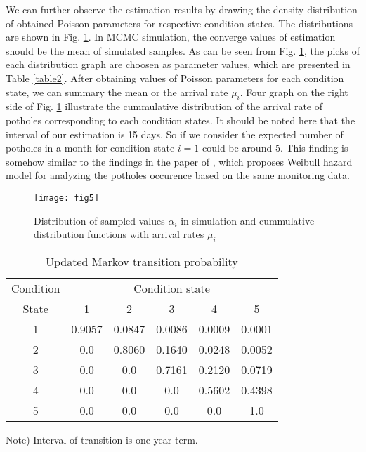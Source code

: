 \documentclass[a4paper,oneside,onecolumn,preprint,10pt,authoryear]{elsarticle}
\begin{document}
We can further observe the estimation results by drawing the density distribution of obtained Poisson parameters for respective condition states. The distributions are shown in Fig. \ref{fig5}. In MCMC simulation, the converge values of estimation should be the mean of simulated samples. As can be seen from Fig. \ref{fig5}, the picks of each distribution graph are choosen as parameter values, which are presented in Table \ref{table2}. After obtaining values of Poisson parameters for each condition state, we can summary the mean or the arrival rate $\mu_i$. Four graph on the right side of Fig. \ref{fig5} illustrate the cummulative distribution of the arrival rate of potholes corresponding to each condition states. It should be noted here that the interval of our estimation is 15 days. So if we consider the expected number of potholes in a month for condition state $i=1$ could be around 5. This finding is somehow similar to the findings in the paper of \citet{kaitokuchi09}, which proposes Weibull hazard model for analyzing the potholes occurence based on the same monitoring data. 

\begin{figure}%
\begin{center}
\begin{footnotesize}
\texttt{[image: fig5]}\\
\end{footnotesize}
\end{center}
\caption{Distribution of sampled values $\alpha_i$ in simulation and cummulative distribution functions with arrival rates $\mu_i$}
\label{fig5}
\end{figure}

\begin{table}[t]
\caption{Updated Markov transition probability}
\label{table4}
\begin{center}
{\small
\begin{tabular}{c|ccccc}\hline
Condition&\multicolumn{5}{|c}{Condition state}\\
State & 1 & 2 & 3 & 4& 5 \\\hline
1 & 0.9057  & 0.0847 & 0.0086 & 0.0009& 0.0001 \\
2 & 0.0  & 0.8060 & 0.1640 & 0.0248&  0.0052 \\
3 & 0.0  & 0.0 & 0.7161 & 0.2120& 0.0719 \\
4 & 0.0  & 0.0 & 0.0 & 0.5602& 0.4398 \\
5 & 0.0  & 0.0 & 0.0 & 0.0& 1.0 \\\hline
\end{tabular}
}
\end{center}
{\small Note) Interval of transition is one year term.}
\end{table}
\end{document}
